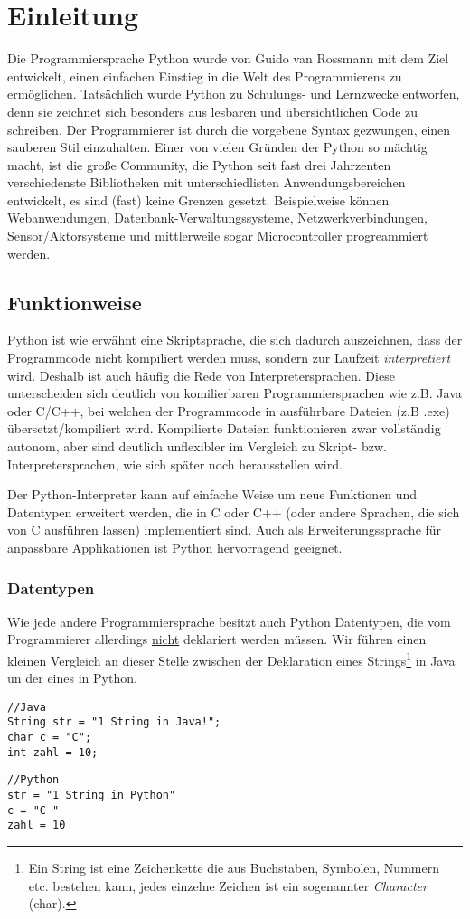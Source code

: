 \chapter{Einleitung}
Die Programmiersprache Python wurde von Guido van Rossmann mit dem Ziel entwickelt, einen einfachen Einstieg in die Welt des Programmierens zu ermöglichen. Tatsächlich wurde Python zu Schulungs- und Lernzwecke entworfen, denn sie zeichnet sich besonders aus lesbaren und übersichtlichen Code zu schreiben. Der Programmierer ist durch die vorgebene Syntax gezwungen, einen sauberen Stil einzuhalten. Einer von vielen Gründen der Python so mächtig macht, ist die große Community, die Python seit fast drei Jahrzenten verschiedenste Bibliotheken mit unterschiedlisten Anwendungsbereichen entwickelt, es sind (fast) keine Grenzen gesetzt. Beispielweise können Webanwendungen, Datenbank-Verwaltungssysteme, Netzwerkverbindungen, Sensor/Aktorsysteme und mittlerweile sogar Microcontroller progreammiert werden. 

\section{Funktionweise}
Python ist wie erwähnt eine Skriptsprache, die sich dadurch auszeichnen, dass der Programmcode nicht kompiliert werden muss, sondern zur Laufzeit \textit{interpretiert} wird. Deshalb ist auch häufig die Rede von Interpretersprachen. Diese unterscheiden sich deutlich von komilierbaren Programmiersprachen wie z.B. Java oder C/C++, bei welchen der Programmcode in ausführbare Dateien (z.B .exe) übersetzt/kompiliert wird. Kompilierte Dateien funktionieren zwar vollständig autonom, aber sind deutlich unflexibler im Vergleich zu Skript- bzw. Interpretersprachen, wie sich später noch herausstellen wird. 

Der Python-Interpreter kann auf einfache Weise um neue Funktionen und Datentypen erweitert werden, die in C oder C++ (oder andere Sprachen, die sich von C ausführen lassen) implementiert sind. Auch als Erweiterungssprache für anpassbare Applikationen ist Python hervorragend geeignet.

\subsection{Datentypen}
Wie jede andere Programmiersprache besitzt auch Python Datentypen, die vom Programmierer allerdings \underline{nicht} deklariert werden müssen. Wir führen einen kleinen Vergleich an dieser Stelle zwischen der Deklaration eines Strings\footnote{Ein String ist eine Zeichenkette die aus Buchstaben, Symbolen, Nummern etc. bestehen kann, jedes einzelne Zeichen ist ein sogenannter \textit{Character} (char).} in Java un der eines in Python.


\begin{lstlisting}
//Java
String str = "1 String in Java!";
char c = "C";
int zahl = 10;
\end{lstlisting}
\begin{lstlisting}
//Python
str = "1 String in Python"
c = "C "
zahl = 10
\end{lstlisting}